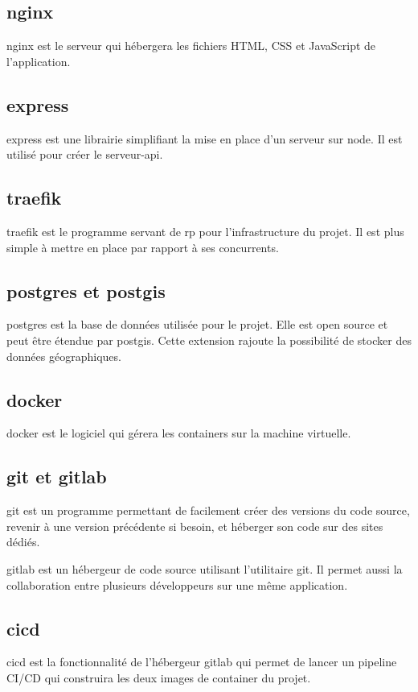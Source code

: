 \documentclass[
    iai, %
    il, %
]{heig-tb}
\begin{document}
\subsection{\gls{nginx}}
\gls{nginx} est le serveur qui hébergera les fichiers HTML, CSS et JavaScript de l'application.

\subsection{\gls{express}}
\gls{express} est une librairie simplifiant la mise en place d'un serveur sur \gls{node}.
Il est utilisé pour créer le serveur-api.

\subsection{\gls{traefik}}
\gls{traefik} est le programme servant de \gls{rp} pour l'infrastructure du projet.
Il est plus simple à mettre en place par rapport à ses concurrents.

\subsection{\gls{postgres} et \gls{postgis}}
\gls{postgres} est la base de données utilisée pour le projet.
Elle est open source et peut être étendue par \gls{postgis}. Cette extension rajoute la possibilité de stocker des données géographiques.

\subsection{\gls{docker}}
\gls{docker} est le logiciel qui gérera les containers sur la machine virtuelle.


\subsection{\gls{git} et \gls{gitlab}}
\gls{git} est un programme permettant de facilement créer des versions du code source, revenir à une version précédente si besoin, et héberger son code sur des sites dédiés.

\gls{gitlab} est un hébergeur de code source utilisant l'utilitaire \gls{git}.
Il permet aussi la collaboration entre plusieurs développeurs sur une même application.

\subsection{\gls{cicd}}
\gls{cicd} est la fonctionnalité de l'hébergeur \gls{gitlab}
qui permet de lancer un pipeline CI/CD qui construira les deux images de container du projet.
\end{document}
